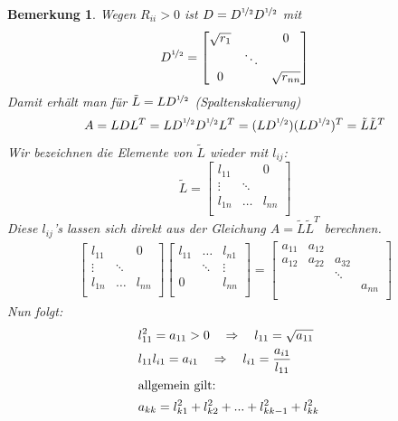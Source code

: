 \documentclass[12pt]{article}
\theoremstyle{break}
\newtheorem*{comment*}{Bemerkung}
\begin{document}
\begin{comment*}
Wegen $R_{ii} > 0$ ist $D = D^{\nicefrac{1}{2}}D^{\nicefrac{1}{2}}$ mit 
$$D^{\nicefrac{1}{2}} =
  \begin{bmatrix}
  \sqrt{r_1} && 0 \\
  & \ddots \\
  0 && \sqrt{r_{nn}} \\
  \end{bmatrix}
$$
Damit erhält man für $\tilde{L} = LD^{\nicefrac{1}{2}}$ (Spaltenskalierung)
$$A = LDL^T = LD^{\nicefrac{1}{2}}D^{\nicefrac{1}{2}}L^T = (LD^{\nicefrac{1}{2}})(LD^{\nicefrac{1}{2}})^T = \tilde{L}\tilde{L}^T$$
Wir bezeichnen die Elemente von $\tilde{L}$ wieder mit $l_{ij}$:
$$\tilde{L} =
  \begin{bmatrix}
  l_{11} && 0 \\
  \vdots& \ddots \\
  l_{1n} &\dots& l_{nn} \\
  \end{bmatrix}
$$
Diese $l_{ij}$'s lassen sich direkt aus der Gleichung $A = \tilde{L}\tilde{L}^T$ berechnen.
\begin{align*}
\begin{bmatrix}
  l_{11} && 0 \\
  \vdots& \ddots \\
  l_{1n} &\dots& l_{nn} \\
\end{bmatrix}
\begin{bmatrix}
  l_{11} &\dots& l_{n1} \\
  & \ddots &\vdots\\
  0 && l_{nn}\\
\end{bmatrix}
=
\begin{bmatrix}
  a_{11}&a_{12} \\
  a_{12}&a_{22}&a_{32} \\
  &&\ddots \\
  &&&a_{nn} \\
\end{bmatrix}
\end{align*}
Nun folgt:
\begin{align*}
&l_{11}^2 = a_{11} > 0 \quad \Rightarrow \quad l_{11} = \sqrt{a_{11}} &\\
&l_{11}l_{i1} = a_{i1} \quad \Rightarrow \quad l_{i1} = \frac{a_{i1}}{l_{11}} &\\
\intertext{allgemein gilt:}
&a_{kk} = l_{k1}^2 + l_{k2}^2 + ... + l_{kk-1}^2 + l_{kk}^2 &\\

\end{align*}
\end{comment*}
\end{document}
